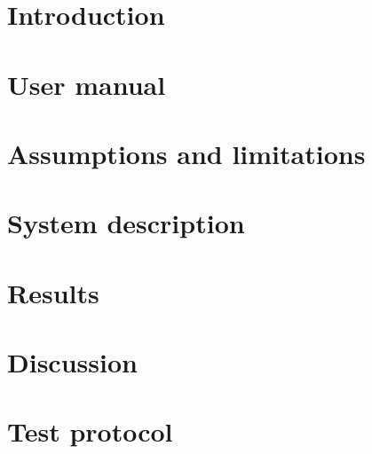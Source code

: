 \documentclass[10pt, titlepage, oneside, a4paper]{article}
\newcommand{\Section}[1]{\section{#1}\vspace{-8pt}}
\begin{document}
    \newpage


    \setlength{\parindent}{0pt}
    \setlength{\parskip}{10pt}

    	\Section{Introduction}
		

	\Section{User manual}
		
	
	\Section{Assumptions and limitations}
		

	\Section{System description}
		
		
	\Section{Results}
		
		
	\Section{Discussion}
		

\appendix
	\Section{Test protocol}
		
\end{document}
